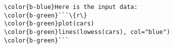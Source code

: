 \documentclass[class=minimal,border=0]{standalone}
\begin{document}
%
\begin{BVerbatim}[bgcolor=b-darkgrey]
\color{b-blue}Here is the input data:
\color{b-green}```\{r\}
\color{b-green}plot(cars)
\color{b-green}lines(lowess(cars), col="blue")
\color{b-green}```
\end{BVerbatim}
\end{document}
